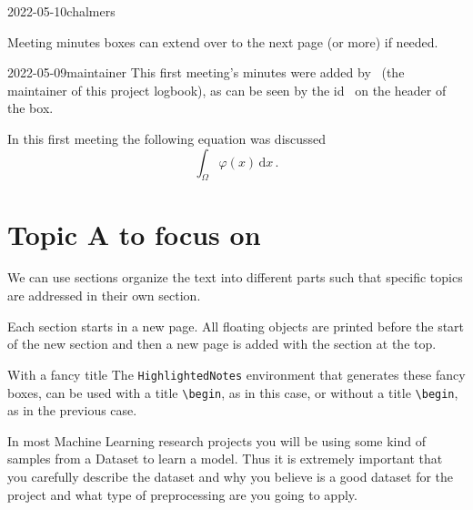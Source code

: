 \documentclass{project-logbook}
\begin{document}
{\begin{MeetingMinutes}{2022-05-10}{chalmers}
		\begin{tip}
			Meeting minutes boxes can extend over to the next page (or more) if needed.
		\end{tip}
	\end{MeetingMinutes}
	
	
	\begin{MeetingMinutes}{2022-05-09}{maintainer}
		This first meeting's minutes were added by \MaintainerName~(the maintainer of this project logbook), as can be seen by the id \emph{\Maintainerid}~on the header of the box.
		
		In this first meeting the following equation was discussed
		\begin{equation}
			\int_{\Omega}{\varphi(x)}\,\mathrm{d}x\,.
		\end{equation}
		\lipsum[1]
	\end{MeetingMinutes}

	


\section{Topic A to focus on} \label{sec:topic_A}
	We can use sections organize the text into different parts  such that specific topics are addressed in their own section.
	
	\begin{HighlightedNote}{}
		Each section starts in a new page. All floating objects are printed before the start of the new section and then a new page is added with the section at the top.
	\end{HighlightedNote}
	
	\begin{HighlightedNote}{With a fancy title}
		The \texttt{HighlightedNotes} environment that generates these fancy boxes, can be used with a title \texttt{\textbackslash begin}, as in this case, or without a title \texttt{\textbackslash begin\string{\string}}, as in the previous case.
	\end{HighlightedNote}
	
\begin{tip}
In most Machine Learning research projects you will be using some kind of samples from a Dataset to learn a model. Thus it is extremely important that you carefully describe the dataset and why you believe is a good dataset for the project and what type of preprocessing are you going to apply.
\end{tip}

}
\end{document}
